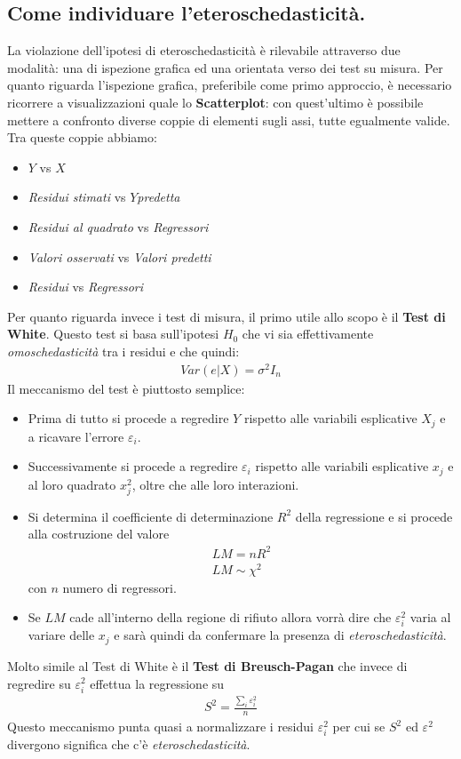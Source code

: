 \documentclass[11pt, twocolumn]{article}
\begin{document}
\subsection*{Come individuare l'eteroschedasticità.}
La violazione dell'ipotesi di eteroschedasticità è rilevabile attraverso due modalità: una di ispezione grafica ed una orientata verso dei test su misura.
Per quanto riguarda l'ispezione grafica, preferibile come primo approccio, è necessario ricorrere a visualizzazioni quale lo \textbf{Scatterplot}: con quest'ultimo è possibile mettere a confronto diverse coppie di elementi sugli assi, tutte egualmente valide.
\newline
Tra queste coppie abbiamo:
\begin{itemize}
\item $Y$ vs $X$
\item \textit{Residui stimati} vs $Y$\textit{predetta}
\item \textit{Residui al quadrato} vs \textit{Regressori}
\item \textit{Valori osservati} vs \textit{Valori predetti}
\item \textit{Residui} vs \textit{Regressori}
\end{itemize}
Per quanto riguarda invece i test di misura, il primo utile allo scopo è il \textbf{Test di White}. Questo test si basa sull'ipotesi $H_0$ che vi sia effettivamente \textit{omoschedasticità} tra i residui e che quindi:
\begin{align*}
Var(e|X) = \sigma^2I_n
\end{align*}
Il meccanismo del test è piuttosto semplice:
\begin{itemize}
\item Prima di tutto si procede a regredire $Y$ rispetto alle variabili esplicative $X_j$ e a ricavare l'errore $\varepsilon_i$.
\item Successivamente si procede a regredire $\varepsilon_i$ rispetto alle variabili esplicative $x_j$ e al loro quadrato $x_j^2$, oltre che alle loro interazioni.
\item Si determina il coefficiente di determinazione $R^2$ della regressione e si procede alla costruzione del valore
\begin{align*}
LM = nR^2 \\
LM \sim \chi^2
\end{align*}
con $n$ numero di regressori.
\item Se $LM$ cade all'interno della regione di rifiuto allora vorrà dire che $\varepsilon_i^2$ varia al variare delle $x_j$ e sarà quindi da confermare la presenza di \textit{eteroschedasticità}.
\end{itemize}
Molto simile al Test di White è il \textbf{Test di Breusch-Pagan} che invece di regredire su $\varepsilon_i^2$ effettua la regressione su
\begin{align*}
S^2 = \frac{\sum_{i} \varepsilon_i^2}{n}
\end{align*}
Questo meccanismo punta quasi a normalizzare i residui $\varepsilon_i^2$ per cui se $S^2$ ed $\varepsilon^2$ divergono significa che c'è \textit{eteroschedasticità}.
\end{document}
